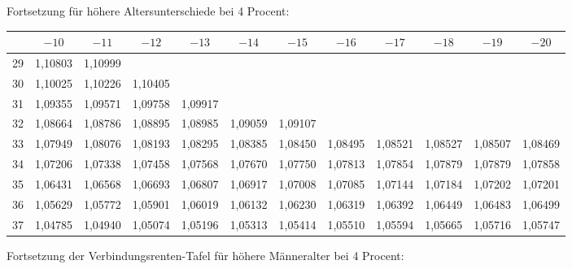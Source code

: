 \documentclass[12pt,a4paper]{article}
\begin{document}
Fortsetzung für höhere Altersunterschiede bei 4 Procent:

\begin{center}
\footnotesize
\begin{tabular}{|c|c|c|c|c|c|c|c|c|c|c|c|}
\hline
 & $-10$ & $-11$ & $-12$ & $-13$ & $-14$ & $-15$ & $-16$ & $-17$ & $-18$ & $-19$ & $-20$ \\
\hline
29 & 1,10803 & 1,10999 & & & & & & & & & \\
30 & 1,10025 & 1,10226 & 1,10405 & & & & & & & & \\
31 & 1,09355 & 1,09571 & 1,09758 & 1,09917 & & & & & & & \\
32 & 1,08664 & 1,08786 & 1,08895 & 1,08985 & 1,09059 & 1,09107 & & & & & \\
33 & 1,07949 & 1,08076 & 1,08193 & 1,08295 & 1,08385 & 1,08450 & 1,08495 & 1,08521 & 1,08527 & 1,08507 & 1,08469 \\
34 & 1,07206 & 1,07338 & 1,07458 & 1,07568 & 1,07670 & 1,07750 & 1,07813 & 1,07854 & 1,07879 & 1,07879 & 1,07858 \\
35 & 1,06431 & 1,06568 & 1,06693 & 1,06807 & 1,06917 & 1,07008 & 1,07085 & 1,07144 & 1,07184 & 1,07202 & 1,07201 \\
36 & 1,05629 & 1,05772 & 1,05901 & 1,06019 & 1,06132 & 1,06230 & 1,06319 & 1,06392 & 1,06449 & 1,06483 & 1,06499 \\
37 & 1,04785 & 1,04940 & 1,05074 & 1,05196 & 1,05313 & 1,05414 & 1,05510 & 1,05594 & 1,05665 & 1,05716 & 1,05747 \\
\hline
\end{tabular}
\end{center}

Fortsetzung der Verbindungsrenten-Tafel für höhere Männeralter bei 4 Procent:
\end{document}
